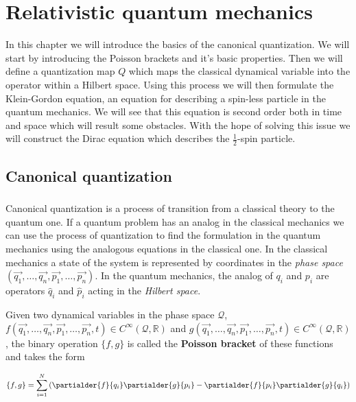 \chapter{Relativistic quantum mechanics}

In this chapter we will introduce the basics of the canonical quantization. We will start by introducing the
Poisson brackets and it's basic properties. Then we will define a quantization map $Q$ which maps the
classical dynamical variable into the operator within a Hilbert space. Using this process we will then
formulate the Klein-Gordon equation, an equation for describing a spin-less particle in the quantum mechanics.
We will see that this equation is second order both in time and space which will result some obstacles. With the
hope of solving this issue we will construct the Dirac equation which describes the $\frac{1}{2}$-spin particle.

\section{Canonical quantization}

\paragraph{} Canonical quantization is a process of transition from a classical theory to the quantum one. If a 
quantum problem has an analog in the classical mechanics we can use the process of quantization to find the formulation
in the quantum mechanics using the analogous equations in the classical one. In the classical mechanics a state of the system
is represented by coordinates in the \textit{phase space} $(\vec{q_{1}}, \dots, \vec{q_{n}}, \vec{p_{1}}, \dots, \vec{p_{n}})$.
In the quantum mechanics, the analog of $q_{i}$ and $p_{i}$ are operators $\hat{q}_{i}$ and $\hat{p}_{i}$ acting in the 
\textit{Hilbert space}.

\begin{definition}
    \label{df:poisson}
    Given two dynamical variables in the phase space $\mathcal{Q}$, \newline $f(\vec{q_{1}}, \dots, \vec{q_{n}}, \vec{p_{1}}, \dots, \vec{p_{n}}, t) 
    \in C^{\infty}(\mathcal{Q}, \mathbb{R})$ and $g(\vec{q_{1}}, \dots, \vec{q_{n}}, \vec{p_{1}}, \dots, \vec{p_{n}}, t) 
    \in C^{\infty}(\mathcal{Q}, \mathbb{R})$, the binary operation $\{f, g\}$ is called the \textbf{Poisson bracket} of these functions and takes the form

    \begin{equation}
        \{f, g\} = \sum_{i=1}^{N}\left(\partialder{f}{q_{i}} \partialder{g}{p_{i}} - \partialder{f}{p_{i}} \partialder{g}{q_{i}}\right)
    \end{equation}
\end{definition}

